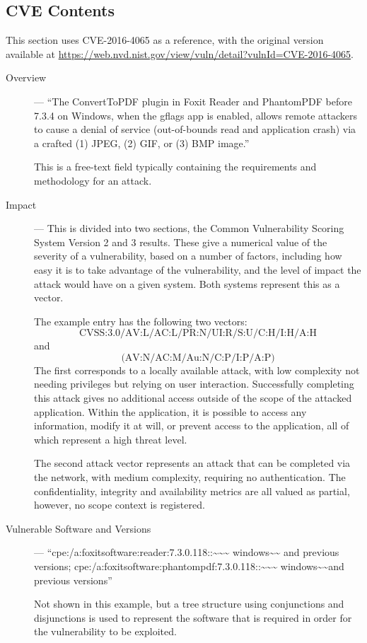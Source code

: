 \subsection{CVE Contents}

This section uses CVE-2016-4065 as a reference, with the original version 
available at \url{https://web.nvd.nist.gov/view/vuln/detail?vulnId=CVE-2016-4065}.

\begin{description}
\item[Overview] --- ``The ConvertToPDF plugin in Foxit Reader and PhantomPDF
	before 7.3.4 on Windows, when the gflags app is enabled, allows remote
	attackers to cause a denial of service (out-of-bounds read and
	application crash) via a crafted (1) JPEG, (2) GIF, or (3) BMP image.''

	This is a free-text field typically containing the requirements and
	methodology for an attack.

\item[Impact] --- This is divided into two sections, the Common Vulnerability
	Scoring System Version 2 and 3 results. These give a numerical value of
	the severity of a vulnerability, based on a number of factors,
	including how easy it is to take advantage of the vulnerability, and
	the level of impact the attack would have on a given system.  Both
	systems represent this as a vector.

	The example entry has the following two vectors:
	\[\text{CVSS:3.0/AV:L/AC:L/PR:N/UI:R/S:U/C:H/I:H/A:H}\] and
	\[\text{(AV:N/AC:M/Au:N/C:P/I:P/A:P)}\]  The first corresponds to a
	locally available attack, with low complexity not needing privileges
	but relying on user interaction.  Successfully completing this attack
	gives no additional access outside of the scope of the attacked
	application.  Within the application, it is possible to access any
	information, modify it at will, or prevent access to the application,
	all of which represent a high threat level.

	The second attack vector represents an attack that can be completed
	via the network, with medium complexity, requiring no authentication.
	The confidentiality, integrity and availability metrics are all valued 
	as partial, however, no scope context is registered.

\item[Vulnerable Software and Versions] ---
	``cpe:/a:foxitsoftware:reader:7.3.0.118::\textasciitilde\textasciitilde\textasciitilde
	windows\textasciitilde\textasciitilde{} and previous versions;
	cpe:/a:foxitsoftware:phantompdf:7.3.0.118::\textasciitilde\textasciitilde\textasciitilde
	windows\textasciitilde\textasciitilde and previous versions'' 

	Not shown in this example, but a tree structure using conjunctions
	and disjunctions is used to represent the software that is required
	in order for the vulnerability to be exploited.
\end{description}

